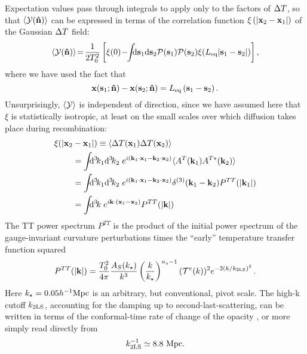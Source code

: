 \documentclass[fleqn,usenatbib]{mnras}
\begin{document}
    Expectation values pass through integrals to apply only to the factors of
    ${\Delta T}$, so that $\left\langle \mathcal{Y}(\mathbf{{\bf\hat{n}}})\right\rangle$ can be
    expressed in terms of the correlation function $\xi\left(\lvert \mathbf{x}_2 -
    \mathbf{x}_1 \rvert \right)$ of the Gaussian ${\Delta T}$ field:
    \begin{equation}
        \left\langle \Yd(\mbf{\nhat})\right\rangle
            \!=\! \frac{1}{2T_0^2 } \left[
                \xi(0) 
                \!-\!\! \int\!\!\!\dif{\mbf{s}_1}\dif{\mbf{s}_2}
                    \mcal{P}(\mbf{s}_1) \mcal{P}(\mbf{s}_2)
                    \xi(\Leq\norm{\mbf{s}_1 - \mbf{s}_2})
            \right],
    \end{equation}
    where we have used the fact that
    \begin{equation}
        \mathbf{x}(\mathbf{s}_1;\mathbf{{\bf\hat{n}}}) - \mathbf{x}(\mathbf{s}_2;\mathbf{{\bf\hat{n}}})
            = L_{\rm eq} \, (\mathbf{s}_1-\mathbf{s}_2)\,.
    \end{equation}
    Unsurprisingly, $\langle\mathcal{Y}\rangle$ is independent of direction, since we
    have assumed here that $\xi$ is statistically isotropic, at least on the
    small scales over which diffusion takes place during recombination:
    \begin{align} \label{eq:xiinrealspace}
        \xi(\norm{\mbf{x}_2 & - \mbf{x}_1})
            \equiv \left\langle \DeltaT(\mbf{x}_1) \DeltaT(\mbf{x}_2)\right\rangle
            \\
            &=
            \int\!\!\! \dif[3]{k_1} \dif[3]{k_2} \;
                \Exp{i(\mbf{k}_1\cdot\mbf{x}_1 - \mbf{k}_2\cdot\mbf{x}_2)}
                \langle A^T(\mbf{k}_1) A^{T*}(\mbf{k}_2) \rangle
            \\
            &=
            \int\!\!\! \dif[3]{k_1} \dif[3]{k_2} \;
                \Exp{i(\mbf{k}_1\cdot\mbf{x}_1 - \mbf{k}_2\cdot\mbf{x}_2)}
            \delta^{(3)}(\mbf{k}_1-\mbf{k}_2)
            P^{TT}(\norm{\mbf{k}_1})
            \\
            &=
            \int\!\!\! \dif[3]k \; \Exp{ i\mbf{k}\cdot(\mbf{x}_1-\mbf{x}_2) }
            P^{TT}(\norm{\mbf{k}}) 
    \end{align}
    The TT power spectrum $P^{TT}$ is the product of the initial power spectrum
    of the gauge-invariant curvature perturbations times the ``early''
    temperature transfer function squared
    \begin{equation}
        P^{TT}(\lvert \mathbf{k} \rvert)
            = \frac{T_0^2}{4\pi}
              \frac{A_S(k_\star)}{k^3}
              \left(\frac{k}{k_\star}\right)^{n_s-1}
              ({\cal{T}}^e(k))^2
              e^{-2 (k/k_{2\rm{LS}})^2}\,.
    \end{equation}
    Here $k_\star=0.05 h^{-1}\rm{Mpc}$ is an arbitrary, but conventional, pivot
    scale.  The high-k cutoff $k_{2\rm{LS}}$, accounting for the damping up to
    second-last-scattering, can be written in terms of the conformal-time rate
    of change of the opacity \citep{Jungman+1996}, or more simply read directly
    from \citet[][eq. 7.139]{Baumann2022} 
    \begin{equation}
        k_{2\rm{LS}}^{-1} \simeq 8.8 \ \rm{Mpc}.
    \end{equation}
\end{document}
